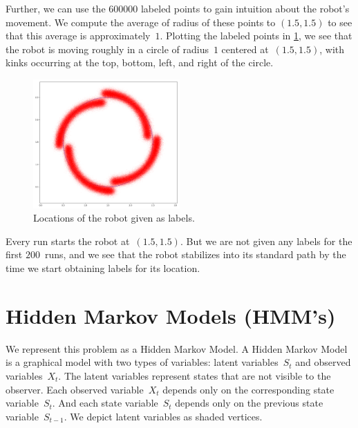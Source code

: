 \documentclass[twoside]{article}
\begin{document}
Further, we can use the $\num{600000}$ labeled points to gain intuition about the robot's movement.
We compute the average of radius of these points to $(1.5, 1.5)$ to see that this average is approximately~$1$.
Plotting the labeled points in \cref{fig:label-locations}, we see that the robot is moving roughly in a circle of radius~$1$ centered at~$(1.5, 1.5)$, with kinks occurring at the top, bottom, left, and right of the circle.
\begin{figure}[h]
  \centering
  \includegraphics[width=0.5\textwidth]{images/label-locations}
  \caption{Locations of the robot given as labels.}\label{fig:label-locations}
\end{figure}

Every run starts the robot at~$(1.5, 1.5)$.
But we are not given any labels for the first $200$~runs, and we see that the robot stabilizes into its standard path by the time we start obtaining labels for its location.

\section{Hidden Markov Models (HMM's)}\label{sec:hidden-markov-models}

We represent this problem as a Hidden Markov Model.
A Hidden Markov Model is a graphical model with two types of variables: latent variables~$S_t$ and observed variables~$X_t$.
The latent variables represent states that are not visible to the observer.
Each observed variable~$X_t$ depends only on the corresponding state variable~$S_t$.
And each state variable~$S_t$ depends only on the previous state variable~$S_{t-1}$.
We depict latent variables as shaded vertices.
\end{document}
